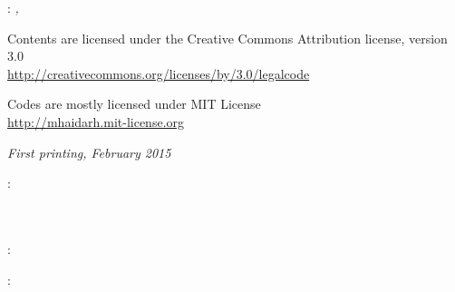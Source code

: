 \thispagestyle{empty}

\hfill

\vfill

\noindent\myName: \textit{\myTitle,} %
\textcopyright\ \myTime

\bigskip

\noindent Contents are licensed under the Creative Commons Attribution license, version 3.0\\
\url{http://creativecommons.org/licenses/by/3.0/legalcode}

\medskip

\noindent Codes are mostly licensed under MIT License\\
\url{http://mhaidarh.mit-license.org}

\bigskip

\noindent \textit{First printing, February 2015}

\bigskip

\noindent{}: \\
\mySupervisor \\
\myProfA \\
\myProfB

\medskip

\noindent{}: \\
\myLocation

\medskip

\noindent{}: \\
\myTime

